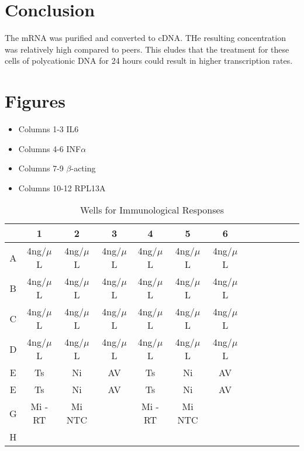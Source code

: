 \documentclass[journal, a4paper]{IEEEtran}
\begin{document}
\section{Conclusion}
The mRNA was purified and converted to cDNA. THe resulting concentration was relatively high compared to peers. This eludes that the
treatment for these cells of polycationic DNA for 24 hours could result in higher transcription rates.

\section{Figures}

  \begin{itemize}
    \item Columns 1-3 IL6
    \item Columns 4-6 INF$\alpha$
    \item Columns 7-9 $\beta$-acting
    \item Columns 10-12 RPL13A
  \end{itemize}

  \begin{table}[!hbt]
    \begin{center}
    \caption{Wells for Immunological Responses}
    \label{tab:simParameters}
    \begin{tabular}{|c|c|c|c|c|c|c|c|c|c|c|c|c|}
      \hline
      & 1 & 2 & 3 & 4 & 5 & 6\\
      \hline
      A & 4ng/$\mu$L & 4ng/$\mu$L & 4ng/$\mu$L & 4ng/$\mu$L & 4ng/$\mu$L & 4ng/$\mu$L\\
      \hline
      B & 4ng/$\mu$L & 4ng/$\mu$L & 4ng/$\mu$L & 4ng/$\mu$L & 4ng/$\mu$L & 4ng/$\mu$L\\
      \hline
      C & 4ng/$\mu$L & 4ng/$\mu$L & 4ng/$\mu$L & 4ng/$\mu$L & 4ng/$\mu$L & 4ng/$\mu$L\\
      \hline
      D & 4ng/$\mu$L & 4ng/$\mu$L & 4ng/$\mu$L & 4ng/$\mu$L & 4ng/$\mu$L & 4ng/$\mu$L\\
      \hline
      E & Ts & Ni & AV & Ts & Ni & AV\\
      \hline
      E & Ts & Ni & AV & Ts & Ni & AV\\
      \hline
      G & Mi -RT & Mi NTC & & Mi -RT & Mi NTC & \\
      \hline
      H & & & & & &\\
      \hline
    \end{tabular}
    \end{center}
  \end{table}
\end{document}
